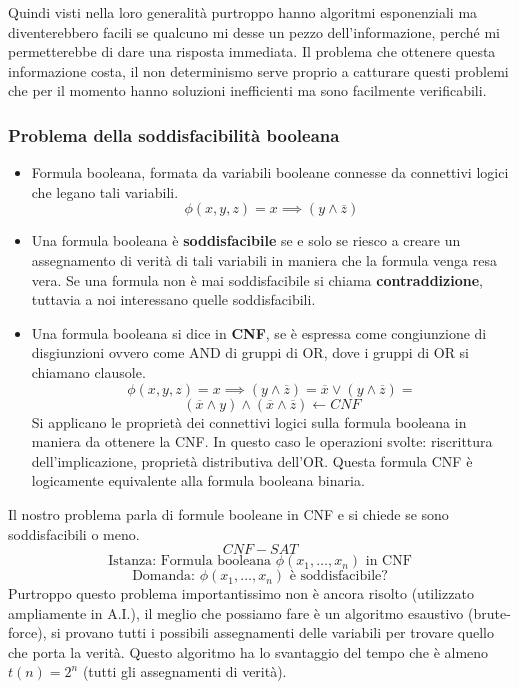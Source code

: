 \documentclass{article}
\begin{document}
Quindi visti nella loro generalità purtroppo hanno algoritmi esponenziali ma diventerebbero facili se
qualcuno mi desse un pezzo dell'informazione, perché mi permetterebbe di dare una risposta immediata.
Il problema che ottenere questa informazione costa, il non determinismo serve proprio a catturare questi
problemi che per il momento hanno soluzioni inefficienti ma sono facilmente verificabili.

\subsubsection{Problema della soddisfacibilità booleana}
\begin{itemize}
    \item Formula booleana, formata da variabili booleane connesse da connettivi logici che legano
          tali variabili.
          $$\phi(x,y,z)=x\implies(y\land \overline{z})$$
    \item Una formula booleana è \textbf{soddisfacibile} se e solo se riesco a creare un assegnamento
          di verità di tali variabili in maniera che la formula venga resa vera. Se una formula non è
          mai soddisfacibile si chiama \textbf{contraddizione}, tuttavia a noi interessano quelle
          soddisfacibili.
    \item Una formula booleana si dice in \textbf{CNF}, se è espressa come congiunzione di disgiunzioni
          ovvero come AND di gruppi di OR, dove i gruppi di OR si chiamano clausole.
          $$\phi(x,y,z)=x\implies(y\land\overline{z})=\overline{x}\lor (y\land\overline{z})=$$
          $$(\overline{x}\land y)\land(\overline{x}\land\overline{z})\leftarrow CNF$$
          Si applicano le proprietà dei connettivi logici sulla formula booleana in maniera da ottenere
          la CNF. In questo caso le operazioni svolte: riscrittura dell'implicazione, proprietà distributiva
          dell'OR. Questa formula CNF è logicamente equivalente alla formula booleana binaria.
\end{itemize}
Il nostro problema parla di formule booleane in CNF e si chiede se sono soddisfacibili o meno.
$$CNF-SAT$$
$$\text{Istanza: Formula booleana }\phi (x_1,\dots,x_n)\text{ in CNF}$$
$$\text{Domanda: }\phi (x_1,\dots,x_n)\text{ è soddisfacibile?}$$
Purtroppo questo problema importantissimo non è ancora risolto (utilizzato ampliamente in A.I.),
il meglio che possiamo fare è un algoritmo esaustivo (brute-force), si provano tutti i possibili
assegnamenti delle variabili per trovare quello che porta la verità. Questo algoritmo ha lo svantaggio
del tempo che è almeno $t(n)=2^n$ (tutti gli assegnamenti di verità).
\end{document}
